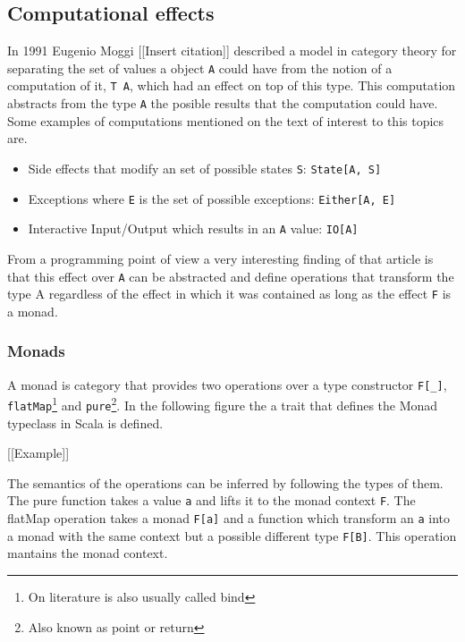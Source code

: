 
\subsection{Computational effects}
In 1991 Eugenio Moggi [[Insert citation]] described a model in category theory
for separating the set of values a object \texttt{A} could have from the notion
of a computation of it, \texttt{T A}, which had an effect on top of this type.
This computation abstracts from the type \texttt{A} the posible results that the
computation could have. Some examples of computations mentioned on the text of
interest to this topics are.

\begin{itemize}
\item Side effects that modify an set of possible states \texttt{S}: \texttt{State[A, S]}
\item Exceptions where \texttt{E} is the set of possible exceptions: \texttt{Either[A, E]}
\item Interactive Input/Output which results in an \texttt{A} value: \texttt{IO[A]}
\end{itemize}

From a programming point of view a very interesting finding of that article is
that this effect over \texttt{A} can be abstracted and define operations that transform
the type A regardless of the effect in which it was contained as long as the
effect \texttt{F} is a monad. %

\subsubsection{Monads}
A monad is category that provides two operations over a type constructor
\texttt{F[\_]}, \texttt{flatMap}\footnote{On literature is also usually called bind} and
\texttt{pure}\footnote{Also known as point or return}. In the following figure the a
trait that defines the Monad typeclass in Scala is defined.

[[Example]]

The semantics of the operations can be inferred by following the types of them.
The pure function takes a value \texttt{a} and lifts it to the monad context
\texttt{F}. The flatMap operation takes a monad \texttt{F[a]} and a function
which transform an \texttt{a} into a monad with the same context but a possible
different type \texttt{F[B]}. This operation mantains the monad context.

